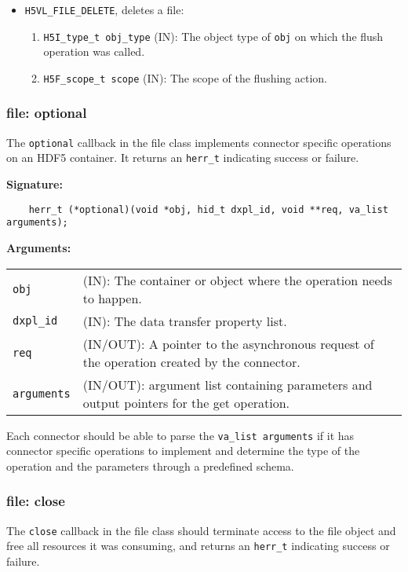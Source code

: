 \begin{mdframed}[style=bgbox]
\begin{itemize}
\item \texttt{H5VL\_FILE\_DELETE}, deletes a file:
  \begin{enumerate}
  \item \texttt{H5I\_type\_t obj\_type} (IN): The object type of \texttt{obj} on which the flush operation was called.
  \item \texttt{H5F\_scope\_t scope} (IN): The scope of the flushing action.
  \end{enumerate}
 \end{itemize}
\end{mdframed}

\subsubsection{file: optional}
The \texttt{optional} callback in the file class implements connector specific operations on an HDF5 container. It returns an 
\texttt{herr\_t} indicating success or failure. \bigskip
\begin{mdframed}[style=bgbox] 
\textbf{Signature:}
\begin{lstlisting}
    herr_t (*optional)(void *obj, hid_t dxpl_id, void **req, va_list arguments);
\end{lstlisting}

\textbf{Arguments:}\\
\begin{tabular}{l p{13.5cm}}
  \texttt{obj} & (IN): The container or object where the operation needs to happen.\\
  \texttt{dxpl\_id} & (IN): The data transfer property list.\\
  \texttt{req} & (IN/OUT): A pointer to the asynchronous request of the operation created by the connector.\\
  \texttt{arguments} & (IN/OUT): argument list containing parameters and output pointers for the get operation. \\
\end{tabular}
\end{mdframed}

Each connector should be able to parse the \texttt{va\_list arguments} if it has connector specific operations to implement and determine the type of the operation and the parameters through a predefined schema.

\subsubsection{file: close}
The \texttt{close} callback in the file class should terminate access to
the file object and free all resources it was consuming, and returns
an \texttt{herr\_t} indicating success or failure.\bigskip\bigskip

